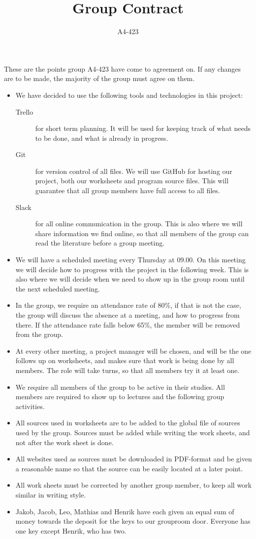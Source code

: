\documentclass[a4paper,12pt,hidelinks]{article}
\newcommand{\group}{A4-423}
\begin{document}
	\title{Group Contract}
	\author{\group}
	\maketitle
	
	These are the points group A4-423 have come to agreement on. If any changes are to be made, the majority of the group must agree on them.
	\begin{itemize}
		\item We have decided to use the following tools and technologies in this project:
		\begin{description}
			\item[Trello] for short term planning. It will be used for keeping track of what needs to be done, and what is already in progress.
			\item[Git] for version control of all files. We will use GitHub for hosting our project, both our worksheets and program source files. This will guarantee that all group members have full access to all files.
			\item[Slack] for all online communication in the group. This is also where we will share information we find online, so that all members of the group can read the literature before a group meeting. 
		\end{description}
		\item We will have a scheduled meeting every Thursday at 09.00. On this meeting we will decide how to progress with the project in the following week. This is also where we will decide when we need to show up in the group room until the next scheduled meeting.
		\item In the group, we require an attendance rate of 80\%, if that is not the case, the group will discuss the absence at a meeting, and how to progress from there. If the attendance rate falls below 65\%, the member will be removed from the group.
		\item At every other meeting, a project manager will be chosen, and will be the one follows up on worksheets, and makes sure that work is being done by all members. The role will take turns, so that all members try it at least one.
		\item We require all members of the group to be active in their studies. All members are required to show up to lectures and the following group activities.
		\item All sources used in worksheets are to be added to the global file of sources used by the group. Sources must be added while writing the work sheets, and not after the work sheet is done. 
		\item All websites used as sources must be downloaded in PDF-format and be given a reasonable name so that the source can be easily located at a later point.
		\item All work sheets must be corrected by another group member, to keep all work similar in writing style.
		\item Jakob, Jacob, Leo, Mathias and Henrik have each given an equal sum of money towards the deposit for the keys to our grouproom door. Everyone has one key except Henrik, who has two.
	\end{itemize}
\end{document}
